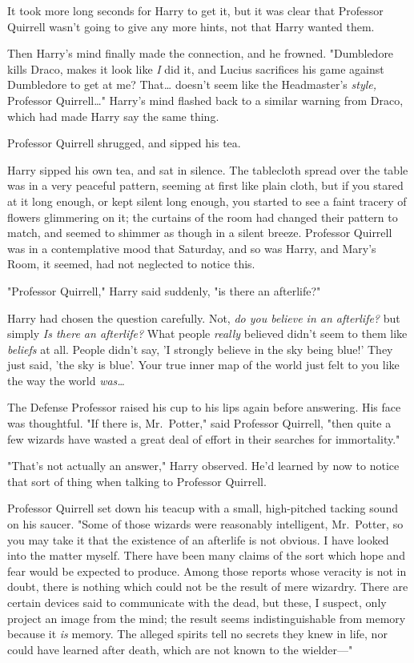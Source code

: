 It took more long seconds for Harry to get it, but it was clear that Professor Quirrell wasn't going to give any more hints, not that Harry wanted them.

Then Harry's mind finally made the connection, and he frowned. "Dumbledore kills Draco, makes it look like \emph{I} did it, and Lucius sacrifices his game against Dumbledore to get at me? That{\ldots} doesn't seem like the Headmaster's \emph{style,} Professor Quirrell{\ldots}" Harry's mind flashed back to a similar warning from Draco, which had made Harry say the same thing.

Professor Quirrell shrugged, and sipped his tea.

Harry sipped his own tea, and sat in silence. The tablecloth spread over the table was in a very peaceful pattern, seeming at first like plain cloth, but if you stared at it long enough, or kept silent long enough, you started to see a faint tracery of flowers glimmering on it; the curtains of the room had changed their pattern to match, and seemed to shimmer as though in a silent breeze. Professor Quirrell was in a contemplative mood that Saturday, and so was Harry, and Mary's Room, it seemed, had not neglected to notice this.

"Professor Quirrell," Harry said suddenly, "is there an afterlife?"

Harry had chosen the question carefully. Not, \emph{do you believe in an afterlife?} but simply \emph{Is there an afterlife?} What people \emph{really} believed didn't seem to them like \emph{beliefs} at all. People didn't say, 'I strongly believe in the sky being blue!' They just said, 'the sky is blue'. Your true inner map of the world just felt to you like the way the world \emph{was{\ldots}}

The Defense Professor raised his cup to his lips again before answering. His face was thoughtful. "If there is, Mr.~Potter," said Professor Quirrell, "then quite a few wizards have wasted a great deal of effort in their searches for immortality."

"That's not actually an answer," Harry observed. He'd learned by now to notice that sort of thing when talking to Professor Quirrell.

Professor Quirrell set down his teacup with a small, high-pitched tacking sound on his saucer. "Some of those wizards were reasonably intelligent, Mr.~Potter, so you may take it that the existence of an afterlife is not obvious. I have looked into the matter myself. There have been many claims of the sort which hope and fear would be expected to produce. Among those reports whose veracity is not in doubt, there is nothing which could not be the result of mere wizardry. There are certain devices said to communicate with the dead, but these, I suspect, only project an image from the mind; the result seems indistinguishable from memory because it \emph{is} memory. The alleged spirits tell no secrets they knew in life, nor could have learned after death, which are not known to the wielder---"

